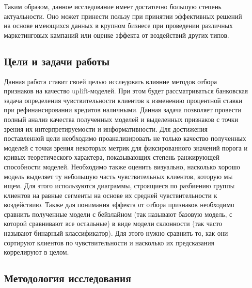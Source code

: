 Таким образом, данное исследование имеет достаточно большую степень актуальности. Оно может принести пользу при принятии эффективных решений на основе имеющихся данных в крупном бизнесе при проведении различных маркетинговых кампаний или оценке эффекта от воздействий других типов.
















\subsection{Цели и задачи работы}

Данная работа ставит своей целью исследовать влияние методов отбора признаков на качество uplift-моделей. При этом будет рассматриваться банковская задача определения чувствительности клиентов к изменению процентной ставки при рефинансировании кредитов наличными. Данная задача позволяет провести полный анализ качества полученных моделей и выделенных признаков с точки зрения их интерпретируемости и информативности. Для достижения поставленной цели необходимо проанализировать не только качество полученных моделей с точки зрения некоторых метрик для фиксированного значений порога и кривых теоретического характера, показывающих степень ранжирующей способности моделей. Необходимо также оценить визуально, насколько хорошо модель выделяет ту небольшую часть чувствительных клиентов, которую мы ищем. Для этого используются диаграммы, строящиеся по разбиению группы клиентов на равные сегменты на основе их средней чувствительности к воздействию. Также для понимания эффекта от отбора признаков необходимо сравнить полученные модели с бейзлайном (так называют базовую модель, с которой сравнивают все остальные) в виде модели склонности (так часто называют бинарный классификатор). Для этого нужно сравнить то, как они сортируют клиентов по чувствительности и насколько их предсказания коррелируют в целом.















\subsection{Методология исследования}

